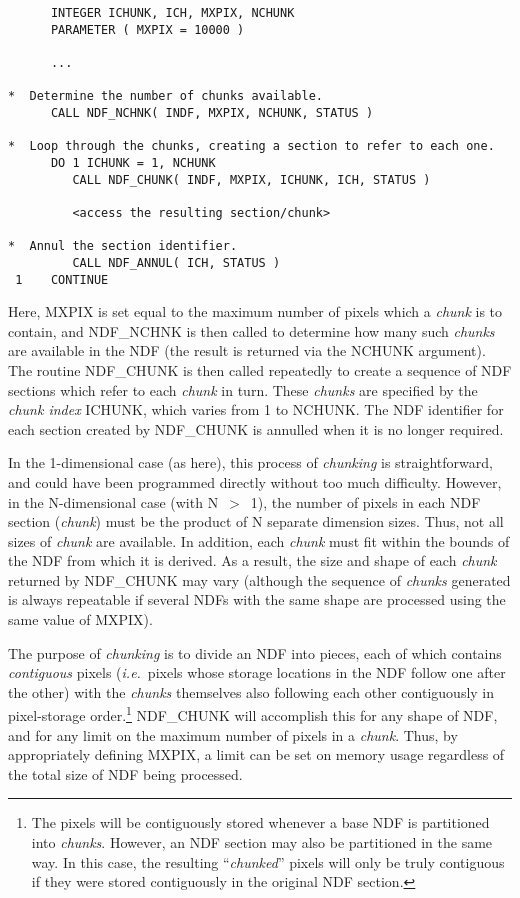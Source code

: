 \documentclass[twoside,11pt]{article}
\newcommand{\st}[1]{{\em{#1}}}
\begin{document}
\small
\begin{verbatim}
      INTEGER ICHUNK, ICH, MXPIX, NCHUNK
      PARAMETER ( MXPIX = 10000 )

      ...

*  Determine the number of chunks available.
      CALL NDF_NCHNK( INDF, MXPIX, NCHUNK, STATUS )

*  Loop through the chunks, creating a section to refer to each one.
      DO 1 ICHUNK = 1, NCHUNK
         CALL NDF_CHUNK( INDF, MXPIX, ICHUNK, ICH, STATUS )

         <access the resulting section/chunk>

*  Annul the section identifier.
         CALL NDF_ANNUL( ICH, STATUS )
 1    CONTINUE
\end{verbatim}
\normalsize

Here, MXPIX is set equal to the maximum number of pixels which a
\st{chunk\/} is to contain, and NDF\_NCHNK is then called to determine
how 
many such \st{chunks\/} are available in the NDF (the result is
returned via the NCHUNK argument). The routine NDF\_CHUNK is then
called repeatedly to create a sequence of NDF sections which refer to
each \st{chunk\/} in turn. These \st{chunks\/} are specified by the
\st{chunk index\/} ICHUNK, which varies from 1 to NCHUNK. The NDF
identifier for each section created by NDF\_CHUNK is annulled when it is
no longer required.

In the 1-dimensional case (as here), this process of \st{chunking\/} is
straightforward, and could have been programmed directly without too
much difficulty. However, in the N-dimensional case (with N~$>$~1), the
number of pixels in each NDF section (\st{chunk\/}) must be the product
of N separate dimension sizes. Thus, not all sizes of \st{chunk\/} are
available. In addition, each \st{chunk\/} must fit within the bounds of
the NDF from which it is derived. As a result, the size and shape of
each \st{chunk\/} returned by NDF\_CHUNK may vary (although the sequence of
\st{chunks\/} generated is always repeatable if several NDFs with the same
shape are processed using the same value of MXPIX).

The purpose of \st{chunking\/} is to divide an NDF into pieces, each of which
contains \st{contiguous\/} pixels (\st{i.e.}\ pixels whose storage locations
in the NDF follow one after the other) with the \st{chunks\/} themselves also
following each other contiguously in pixel-storage order.\footnote{The pixels
will be contiguously stored whenever a base NDF is partitioned into \st{chunks}. However, an NDF section may also be partitioned in the same way. In
this case, the resulting ``\st{chunked\/}'' pixels will only be truly
contiguous if they were stored contiguously in the original NDF section.}
NDF\_CHUNK will accomplish this for any shape of NDF, and for any limit on the
maximum number of pixels in a \st{chunk}. Thus, by appropriately defining
MXPIX, a limit can be set on memory usage regardless of the total size of NDF
being processed.
\end{document}
